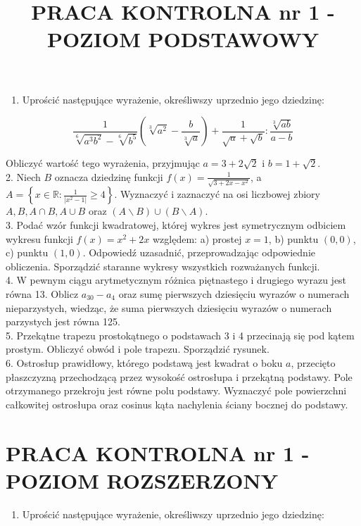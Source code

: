 \documentclass[10pt]{article}
\title{PRACA KONTROLNA nr 1 - POZIOM PODSTAWOWY }
\author{}
\date{}
\begin{document}
\maketitle
\begin{enumerate}
  \item Uprościć następujące wyrażenie, określiwszy uprzednio jego dziedzinę:
\end{enumerate}

$$
\frac{1}{\sqrt[6]{a^{3} b^{2}}-\sqrt[6]{b^{5}}}\left(\sqrt[3]{a^{2}}-\frac{b}{\sqrt[3]{a}}\right)+\frac{1}{\sqrt{a}+\sqrt{b}}: \frac{\sqrt[3]{a b}}{a-b}
$$

Obliczyć wartość tego wyrażenia, przyjmując $a=3+2 \sqrt{2}$ i $b=1+\sqrt{2}$.\\
2. Niech $B$ oznacza dziedzinę funkcji $f(x)=\frac{1}{\sqrt{3+2 x-x^{2}}}$, a $A=\left\{x \in \mathbb{R}: \frac{1}{\left|x^{2}-1\right|} \geqslant 4\right\}$. Wyznaczyć i zaznaczyć na osi liczbowej zbiory $A, B, A \cap B, A \cup B$ oraz $(A \backslash B) \cup(B \backslash A)$.\\
3. Podać wzór funkcji kwadratowej, której wykres jest symetrycznym odbiciem wykresu funkcji $f(x)=x^{2}+2 x$ względem: a) prostej $x=1$, b) punktu $(0,0)$, c) punktu $(1,0)$. Odpowiedź uzasadnić, przeprowadzając odpowiednie obliczenia. Sporządzić staranne wykresy wszystkich rozważanych funkcji.\\
4. W pewnym ciągu arytmetycznym różnica piętnastego i drugiego wyrazu jest równa 13. Oblicz $a_{30}-a_{4}$ oraz sumę pierwszych dziesięciu wyrazów o numerach nieparzystych, wiedząc, że suma pierwszych dziesięciu wyrazów o numerach parzystych jest równa 125.\\
5. Przekątne trapezu prostokątnego o podstawach 3 i 4 przecinają się pod kątem prostym. Obliczyć obwód i pole trapezu. Sporządzić rysunek.\\
6. Ostrosłup prawidłowy, którego podstawą jest kwadrat o boku $a$, przecięto płaszczyzną przechodzącą przez wysokość ostrosłupa i przekątną podstawy. Pole otrzymanego przekroju jest równe polu podstawy. Wyznaczyć pole powierzchni całkowitej ostrosłupa oraz cosinus kąta nachylenia ściany bocznej do podstawy.

\section*{PRACA KONTROLNA nr 1 - POZIOM ROZSZERZONY}
\begin{enumerate}
  \item Uprościć następujące wyrażenie, określiwszy uprzednio jego dziedzinę:
\end{enumerate}
\end{document}

